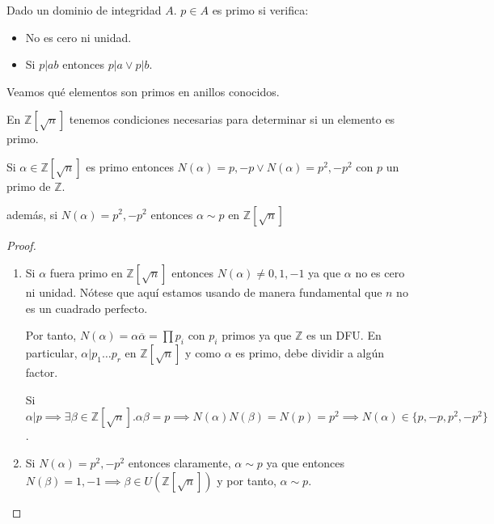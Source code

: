 \begin{definition}
Dado un dominio de integridad $A$. $p \in A$ es primo si verifica:

\begin{itemize}
\item No es cero ni unidad.
\item Si $p|ab$ entonces $p|a \lor p|b$. 
\end{itemize}
\end{definition}

\begin{example}
Veamos qué elementos son primos en anillos conocidos.

En $\mathbb{Z}[\sqrt{n}]$ tenemos condiciones necesarias para determinar si un elemento es primo. 

\begin{proposition}
Si $\alpha \in \mathbb{Z}[\sqrt{n}]$ es primo entonces $N(\alpha) = p,-p \lor N(\alpha) = p^2,-p^2$ con $p$ un primo de $\mathbb{Z}$. 

además, si $N(\alpha) = p^2,-p^2$ entonces $\alpha \sim p$ en $\mathbb{Z}[\sqrt{n}]$
\end{proposition}
\begin{proof}
\begin{enumerate}
\item Si $\alpha$ fuera primo en $\mathbb{Z}[\sqrt{n}]$   entonces $N(\alpha) \neq 0,1,-1$ ya que $\alpha$ no es cero ni unidad. Nótese que aquí estamos usando de manera fundamental que $n$ no es un cuadrado perfecto. 

Por tanto, $N(\alpha) = \alpha \overline{\alpha} = \prod p_i$ con $p_i$ primos ya que $\mathbb{Z}$ es un DFU. En particular, $\alpha|p_1 \ldots p_r$ en $\mathbb{Z}[\sqrt{n}]$ y como $\alpha$ es primo, debe dividir a algún factor. 

Si $\alpha|p \implies \exists \beta \in \mathbb{Z}[\sqrt{n}].\alpha \beta = p \implies N(\alpha)N(\beta) = N(p) = p^2 \implies N(\alpha) \in \{p,-p,p^2,-p^2\}$. 

\item Si $N(\alpha) = p^2,-p^2$ entonces claramente, $\alpha \sim p$ ya que entonces $N(\beta) = 1,-1 \implies \beta \in U(\mathbb{Z}[\sqrt{n}])$ y por tanto, $\alpha \sim p$. 
\end{enumerate}
\end{proof}
\end{example}

